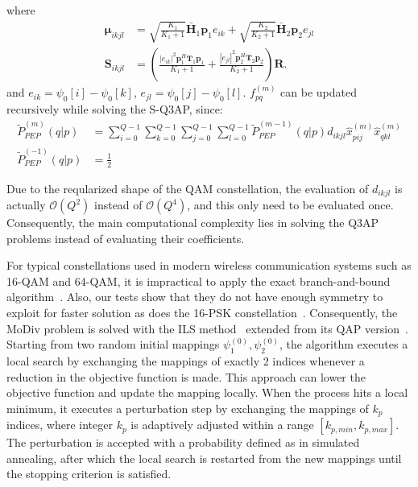 \documentclass[journal,draftcls,onecolumn,12pt,twoside]{IEEEtran}
\begin{document}
where 
\begin{subequations}
  \begin{align}
    \bm{\mu}_{ikjl} & = \sqrt{\frac{K_1}{K_1+1}}\bar{\mathbf{H}}_1\mathbf{p}_1
    e_{ik} + \sqrt{\frac{K_2}{K_2+1}}\bar{\mathbf{H}}_2\mathbf{p}_2e_{jl} \\
    \mathbf{S}_{ikjl} & = \left(\frac{|e_{ik}|^2
    \mathbf{p}_1^H\mathbf{T}_1 \mathbf{p}_1}{K_1+1} + \frac{|e_{jl}|^2
    \mathbf{p}_2^H\mathbf{T}_2 \mathbf{p}_2}{K_2+1}\right) \mathbf{R}.
  \end{align}
\end{subequations}
and $e_{ik} = \psi_0[i] - \psi_0[k]$, $e_{jl} = \psi_0[j] - \psi_0[l]$.
$f_{pq}^{(m)}$ can be updated recursively while solving the S-Q3AP, since:
\begin{subequations}
  \begin{align}
    \tilde{P}_{PEP}^{(m)}(q|p) & =
    \sum_{i=0}^{Q-1}\sum_{k=0}^{Q-1}\sum_{j=0}^{Q-1}
    \sum_{l=0}^{Q-1}\tilde{P}_{PEP}^{(m-1)}(q|p)d_{ikjl}
    \hat{x}_{pij}^{(m)}\hat{x}_{qkl}^{(m)}
    \\
    \tilde{P}_{PEP}^{(-1)}(q|p) & = \frac{1}{2}
  \end{align}
  \label{eq:pep_update}
\end{subequations}

Due to the reqularized shape of the QAM constellation, the evaluation of
$d_{ikjl}$ is actually $\mathcal{O}(Q^2)$ instead of $\mathcal{O}(Q^4)$, and
this only need to be evaluated once. Consequently, the main computational
complexity lies in solving the Q3AP problems instead of evaluating their
coefficients.

For typical constellations used in modern wireless communication systems such as
16-QAM and 64-QAM, it is impractical to apply the exact branch-and-bound
algorithm~\cite{hahn2008quadratic}. Also, our tests show that they do not have
enough symmetry to exploit for faster solution as does the 16-PSK
constellation~\cite{mittelmann2015solving}.
Consequently, the MoDiv problem is solved with the ILS
method~\cite{hahn2008quadratic} extended from its QAP
version~\cite{stutzle2006iterated}. Starting from two random initial mappings
$\psi_1^{(0)}, \psi_2^{(0)}$, the algorithm executes a local search by
exchanging the mappings of exactly 2 indices whenever a reduction in the
objective function is made. This approach can lower the objective function and
update the mapping locally. When the process hits a local minimum, it executes a
perturbation step by exchanging the mappings of $k_p$ indices, where integer
$k_p$ is adaptively adjusted within a range $[k_{p,min}, k_{p,max}]$. The
perturbation is accepted with a probability defined as in simulated annealing,
after which the local search is restarted from the new mappings until the
stopping criterion is satisfied.
\end{document}
